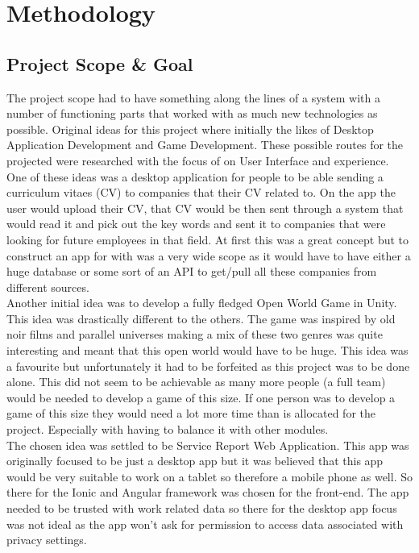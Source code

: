 \chapter{Methodology}
\section{Project Scope \& Goal}
The project scope had to have something along the lines of a system with a number of functioning parts that worked with as much new technologies as possible. Original ideas for this project where initially the likes of Desktop Application Development and Game Development. These possible routes for the projected were researched with the focus of on User Interface and experience. One of these ideas was a desktop application for people to be able sending a curriculum vitaes (CV) to companies that their CV related to. On the app the user would upload their CV, that CV would be then sent through a system that would read it and pick out the key words and sent it to companies that were looking for future employees in that field. At first this was a great concept but to construct an app for with was a very wide scope as it would have to have either a huge database or some sort of an API to get/pull all these companies from different sources. 
\\ Another initial idea was to develop a fully fledged Open World Game in Unity. This idea was drastically different to the others. The game was inspired by old noir films and parallel universes making a mix of these two genres was quite interesting and meant that this open world would have to be huge. This idea was a favourite but unfortunately it had to be forfeited as this project was to be done alone. This did not seem to be achievable as many more people (a full team) would be needed to develop a game of this size. If one person was to develop a game of this size they would need a lot more time than is allocated for the project. Especially with having to balance it with other modules.
\\ The chosen idea was settled to be Service Report Web Application. This app was originally focused to be just a desktop app but it was believed that this app would be very suitable to work on a tablet so therefore a mobile phone as well. So there for the Ionic and Angular framework was chosen for the front-end. The app needed to be trusted with work related data so there for the desktop app focus was not ideal as the app won't ask for permission to access data associated with privacy settings.
